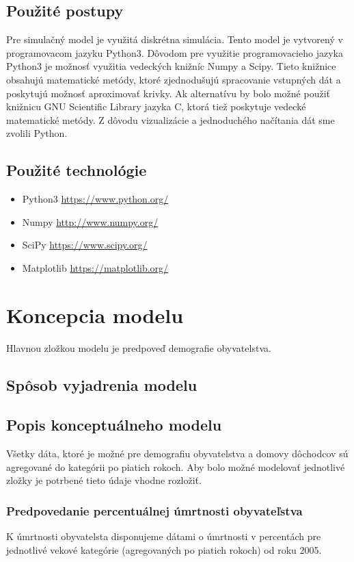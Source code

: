 \documentclass[a4paper, 11pt]{article}
\begin{document}
\subsection{Použité postupy}
Pre simulačný model je využitá diskrétna simulácia\cite[str. 34]{IMS}. Tento model je vytvorený v programovacom jazyku Python3. Dôvodom pre využitie programovacieho jazyka Python3 je možnosť využitia vedeckých knižníc Numpy a Scipy. Tieto knižnice obsahujú matematické metódy, ktoré zjednodušujú spracovanie vstupných dát a poskytujú možnosť aproximovať krivky. Ak alternatívu by bolo možné použiť knižnicu GNU Scientific Library jazyka C, ktorá tiež poskytuje vedecké matematické metódy. Z dôvodu vizualizácie a jednoduchého načítania dát sme zvolili Python.%

\subsection{Použité technológie}
\begin{itemize}
\item Python3 \url{https://www.python.org/}
\item Numpy \url{http://www.numpy.org/}
\item SciPy \url{https://www.scipy.org/}
\item Matplotlib \url{https://matplotlib.org/}
\end{itemize}

\section{Koncepcia modelu}
Hlavnou zložkou modelu je predpoveď demografie obyvatelstva.

\subsection{Spôsob vyjadrenia modelu}
\subsection{Popis konceptuálneho modelu}
Všetky dáta, ktoré je možné pre demografiu obyvatelstva a domovy dôchodcov sú agregované do kategórii po piatich rokoch. Aby bolo možné modelovať jednotlivé zložky je potrbené tieto údaje vhodne rozložiť.

\subsubsection*{Predpovedanie percentuálnej úmrtnosti obyvateľstva}
K úmrtnosti obyvatelsta disponujeme dátami o úmrtnosti v percentách pre jednotlivé vekové kategórie (agregovaných po piatich rokoch) od roku 2005.
\end{document}
